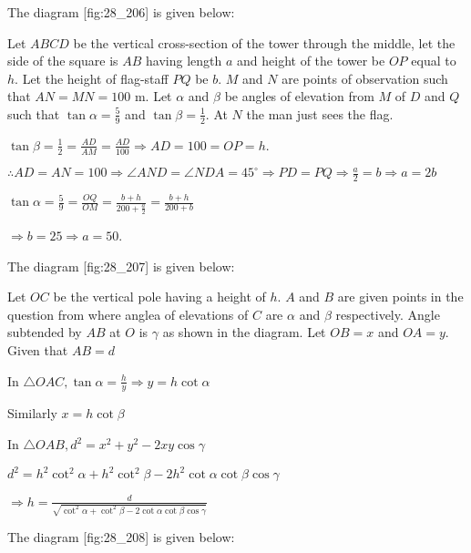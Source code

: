 \item The diagram [fig:28_206] is given below:

  \startplacefigure[reference=fig:28_206]
    \externalfigure[28_206.pdf]
  \stopplacefigure

  Let $ABCD$ be the vertical cross-section of the tower through the middle, let the side of the
  square is $AB$ having length $a$ and height of the tower be $OP$ equal to
  $h$. Let the height of flag-staff $PQ$ be $b$. $M$ and $N$ are points of
  observation such that $AN = MN = 100$ m. Let $\alpha$ and $\beta$ be angles of
  elevation from $M$ of $D$ and $Q$ such that $\tan\alpha = \frac{5}{9}$ and
  $\tan\beta = \frac{1}{2}$. At $N$ the man just sees the flag.

  $\tan\beta = \frac{1}{2} = \frac{AD}{AM} = \frac{AD}{100} \Rightarrow AD = 100 = OP = h$.

  $\therefore AD = AN = 100 \Rightarrow \angle AND = \angle NDA = 45^\circ \Rightarrow PD = PQ
  \Rightarrow \frac{a}{2} = b \Rightarrow a = 2b$

  $\tan\alpha = \frac{5}{9} = \frac{OQ}{OM} = \frac{b + h}{200 + \frac{a}{2}} = \frac{b + h}{200 +
    b}$

  $\Rightarrow b = 25 \Rightarrow a = 50$.

\item The diagram [fig:28_207] is given below:

  \startplacefigure[reference=fig:28_207]
    \externalfigure[28_207.pdf]
  \stopplacefigure

  Let $OC$ be the vertical pole having a height of $h$. $A$ and $B$ are given
  points in the question from where anglea of elevations of $C$ are $\alpha$ and
  $\beta$ respectively. Angle subtended by $AB$ at $O$ is $\gamma$ as shown in
  the diagram. Let $OB = x$ and $OA = y$. Given that $AB = d$

  In $\triangle OAC, \tan\alpha = \frac{h}{y}\Rightarrow y = h\cot\alpha$

  Similarly $x = h\cot\beta$

  In $\triangle OAB, d^2 = x^2 + y^2 - 2xy\cos\gamma$

  $d^2 = h^2\cot^2\alpha + h^2\cot^2\beta - 2h^2\cot\alpha\cot\beta\cos\gamma$

  $\Rightarrow h = \frac{d}{\sqrt{\cot^2\alpha + \cot^2\beta - 2\cot\alpha\cot\beta\cos\gamma}}$

\item The diagram [fig:28_208] is given below:

